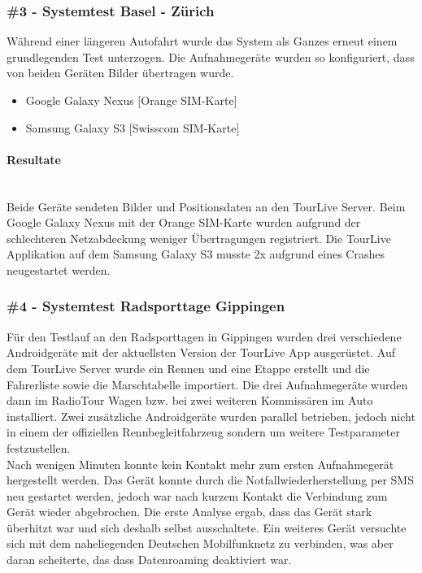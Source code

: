 \subsubsection{\#3 - Systemtest Basel - Zürich}
Während einer längeren Autofahrt wurde das System als Ganzes erneut einem grundlegenden Test unterzogen. Die Aufnahmegeräte wurden so konfiguriert, dass von beiden Geräten Bilder übertragen wurde.

\begin{itemize} [noitemsep,topsep=0pt]
	\item Google Galaxy Nexus [Orange SIM-Karte]
	\item Samsung Galaxy S3 [Swisscom SIM-Karte]
\end{itemize}

\paragraph*{Resultate} \mbox{} \\
Beide Geräte sendeten Bilder und Positionsdaten an den TourLive Server. Beim Google Galaxy Nexus mit der Orange SIM-Karte wurden aufgrund der schlechteren Netzabdeckung weniger Übertragungen registriert. Die TourLive Applikation auf dem Samsung Galaxy S3 musste 2x aufgrund eines Crashes neugestartet werden.

\subsubsection{\#4 - Systemtest Radsporttage Gippingen}
\label{sec:testberichtgippingen}
Für den Testlauf an den Radsporttagen in Gippingen wurden drei verschiedene Androidgeräte mit der aktuellsten Version der TourLive App ausgerüstet. Auf dem TourLive Server wurde ein Rennen und eine Etappe erstellt und die Fahrerliste sowie die Marschtabelle importiert. Die drei Aufnahmegeräte wurden dann im RadioTour Wagen bzw. bei zwei weiteren Kommissären im Auto installiert. Zwei zusätzliche Androidgeräte wurden parallel betrieben, jedoch nicht in einem der offiziellen Rennbegleitfahrzeug sondern um weitere Testparameter festzustellen.
\\

Nach wenigen Minuten konnte kein Kontakt mehr zum ersten Aufnahmegerät hergestellt werden. Das Gerät konnte durch die Notfallwiederherstellung per SMS neu gestartet werden, jedoch war nach kurzem Kontakt die Verbindung zum Gerät wieder abgebrochen. Die erste Analyse ergab, dass das Gerät stark überhitzt war und sich deshalb selbst ausschaltete. Ein weiteres Gerät versuchte sich mit dem naheliegenden Deutschen Mobilfunknetz zu verbinden, was aber daran scheiterte, das dass Datenroaming deaktiviert war.
\\

